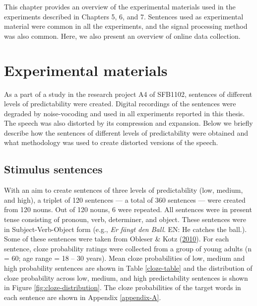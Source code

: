 \documentclass[a4paper, nobind]{templates/ociamthesis}
\renewcommand{\chaptermark}[1]{\markboth{\thechapter. #1}{\thechapter. #1}}
\begin{document}
\chaptermark{Methods}

This chapter provides an overview of the experimental materials used in the experiments described in Chapters 5, 6, and 7.
Sentences used as experimental material were common in all the experiments,
and the signal processing method was also common.
Here, we also present an overview of online data collection.

\hypertarget{experimental-materials}{%
\section{Experimental materials}\label{experimental-materials}}

As a part of a study in the research project A4 of SFB1102, sentences of different levels of predictability were created.
Digital recordings of the sentences were degraded by noise-vocoding and used in all experiments reported in this thesis.
The speech was also distorted by its compression and expansion.
Below we briefly describe how the sentences of different levels of predictability were obtained
and what methodology was used to create distorted versions of the speech.

\hypertarget{stimulus-sentences}{%
\subsection{Stimulus sentences}\label{stimulus-sentences}}

With an aim to create sentences of three levels of predictability (low, medium, and high), a triplet of 120 sentences --- a total of 360 sentences --- were created from 120 nouns.
Out of 120 nouns, 6 were repeated.
All sentences were in present tense consisting of pronoun, verb, determiner, and object.
These sentences were in Subject-Verb-Object form (e.g., \emph{Er fängt den Ball}. EN: He catches the ball.).
Some of these sentences were taken from Obleser \& Kotz (\protect\hyperlink{ref-Obleser2010}{2010}).
For each sentence, cloze probability ratings were collected from a group of young adults (n = 60; age range = 18 -- 30 years).
Mean cloze probabilities of low, medium and high probability sentences are shown in Table \ref{cloze-table} and
the distribution of cloze probability across low, medium, and high predictability sentences is shown in Figure \ref{fig:cloze-distribution}.
The cloze probabilities of the target words in each sentence are shown in Appendix \ref{appendix-A}.
\end{document}
